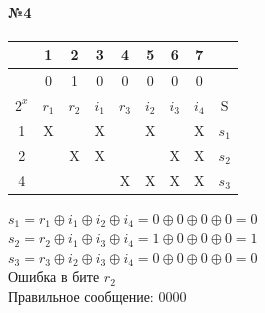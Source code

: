 \documentclass[12pt,onecolumn]{article}
\begin{document}
\begin{flushleft}
\paragraph{№4}
\hfill \break
\FloatBarrier
\begin{table}[h!]
  \begin{tabular}{|c|c|c|c|c|c|c|c|c|}

  \hline
                       & 1                         & 2                         & 3                         & 4                         & 5                         & 6                         & 7                         &      \\ \hline
                       & 0                         & 1                         & 0                         & 0                         & 0                         & 0                         & 0                         &      \\ \hline
  $2^x$ & $r_1$                             & $r_2$                      & $i_1$                      & $r_3$                     & $i_2$                      & $i_3$                      & $i_4$                      & S    \\ \hline
  1                    & \cellcolor[HTML]{32CB00}X &                           & \cellcolor[HTML]{32CB00}X &                           & \cellcolor[HTML]{32CB00}X &                           & \cellcolor[HTML]{32CB00}X & $s_1$ \\ \hline
  2                    &                           & \cellcolor[HTML]{34CDF9}X & \cellcolor[HTML]{34CDF9}X &                           &                           & \cellcolor[HTML]{34CDF9}X & \cellcolor[HTML]{34CDF9}X & $s_2$ \\ \hline
  4                    &                           &                           &                           & \cellcolor[HTML]{FFCC67}X & \cellcolor[HTML]{FFCC67}X & \cellcolor[HTML]{FFCC67}X & \cellcolor[HTML]{FFCC67}X & $s_3$ \\ \hline
  \end{tabular}
\end{table}
$s_1 = r_1\oplus i_1 \oplus i_2 \oplus i_4 = 0 \oplus 0 \oplus 0 \oplus 0 = 0 $\\
$s_2 = r_2\oplus i_1 \oplus i_3 \oplus i_4 = 1 \oplus 0 \oplus 0 \oplus 0 = 1 $\\
$s_3 = r_3\oplus i_2 \oplus i_3 \oplus i_4 = 0 \oplus 0 \oplus 0 \oplus 0 = 0 $\\
Ошибка в бите $r_2$\\
Правильное сообщение: $0000$

\end{flushleft}
\end{document}
